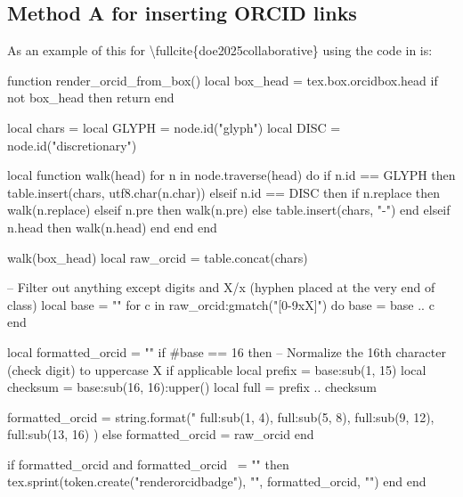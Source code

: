 \documentclass[12pt, twoside]{article}
\begin{document}
\subsection{Method A for inserting ORCID links}
\label{sec:orcidlinksMethodA}
As an example of this for \textbackslash fullcite\{doe2025collaborative\} using the code in  is:
\newbox\orcidbox

\newcommand*{\renderorcidbadge}[1]{%
\orcidlink{#1}%
}

\begin{luacode*}
function render_orcid_from_box()
  local box_head = tex.box.orcidbox.head
  if not box_head then return end

  local chars = {}
  local GLYPH = node.id("glyph")
  local DISC  = node.id("discretionary")

  local function walk(head)
    for n in node.traverse(head) do
      if n.id == GLYPH then
        table.insert(chars, utf8.char(n.char))
      elseif n.id == DISC then
        if n.replace then
          walk(n.replace)
        elseif n.pre then
          walk(n.pre)
        else
          table.insert(chars, "-")
        end
      elseif n.head then
        walk(n.head)
      end
    end
  end

  walk(box_head)
  local raw_orcid = table.concat(chars)

  -- Filter out anything except digits and X/x (hyphen placed at the very end of class)
  local base = ""
  for c in raw_orcid:gmatch("[0-9xX]") do
    base = base .. c
  end

  local formatted_orcid = ""
  if #base == 16 then
    -- Normalize the 16th character (check digit) to uppercase X if applicable
    local prefix = base:sub(1, 15)
    local checksum = base:sub(16, 16):upper()
    local full = prefix .. checksum

    formatted_orcid = string.format("%
      full:sub(1, 4),
      full:sub(5, 8),
      full:sub(9, 12),
      full:sub(13, 16)
    )
  else
    formatted_orcid = raw_orcid
  end

  if formatted_orcid and formatted_orcid ~= "" then
    tex.sprint(token.create("renderorcidbadge"), "{", formatted_orcid, "}")
  end
end
\end{luacode*}

\begingroup
\renewcommand*{\mkbibnamefamily}[1]{%
  #1%
  \edef\curridx{\the\value{listcount}}%
  \haspartannotation[author][default][\curridx]{equal}{%
    \textsuperscript{*}%
  }{}%
  \haspartannotation[author][default][\curridx]{orcid}{%
    \global\setbox\orcidbox=\hbox{\getpartannotation[author][default][\curridx]{orcid}}%
    \directlua{render_orcid_from_box()}%
  }{}%
}
\end{document}

